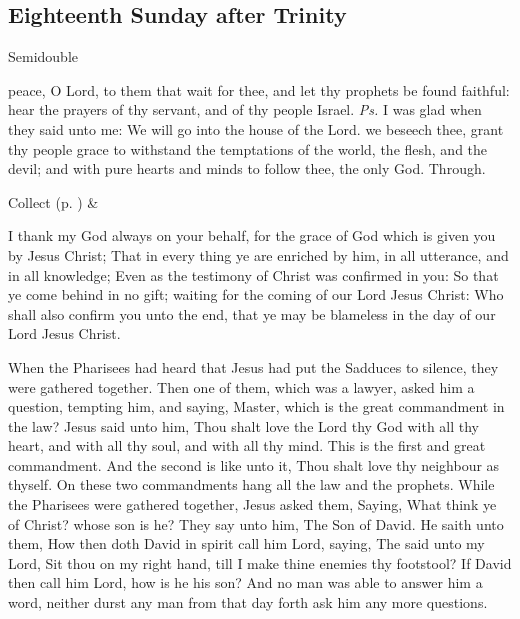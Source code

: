 \clearpage
\subsection{Eighteenth Sunday after Trinity}
\begin{inhead}
{Semidouble}
\end{inhead}


\introit
{} peace, O Lord, to them that wait for thee, and let thy prophets be found faithful: hear the prayers of thy servant, and of thy people Israel. \textit{Ps.} I was glad when they said unto me: We will go into the house of the Lord.
\collect
{} we beseech thee, grant thy people grace to withstand the temptations of the world, the flesh, and the devil; and with pure hearts and minds to follow thee, the only God. Through.
\begin{rubric}
     Collect  (p. \pageref{SPSaints}) \&  
\end{rubric}

 I thank my God always on your behalf, for the grace of God which is given you by Jesus Christ; That in every thing ye are enriched by him, in all utterance, and in all knowledge; Even as the testimony of Christ was confirmed in you: So that ye come behind in no gift; waiting for the coming of our Lord Jesus Christ: Who shall also confirm you unto the end, that ye may be blameless in the day of our Lord Jesus Christ.


 When the Pharisees had heard that Jesus had put the Sadduces to silence, they were gathered together. Then one of them, which was a lawyer, asked him a question, tempting him, and saying, Master, which is the great commandment in the law? Jesus said unto him, Thou shalt love the Lord thy God with all thy heart, and with all thy soul, and with all thy mind. This is the first and great commandment. And the second is like unto it, Thou shalt love thy neighbour as thyself. On these two commandments hang all the law and the prophets. While the Pharisees were gathered together, Jesus asked them, Saying, What think ye of Christ? whose son is he? They say unto him, The Son of David. He saith unto them, How then doth David in spirit call him Lord, saying, The  said unto my Lord, Sit thou on my right hand, till I make thine enemies thy footstool? If David then call him Lord, how is he his son? And no man was able to answer him a word, neither durst any man from that day forth ask him any more questions.

